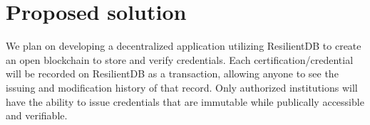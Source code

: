 \section{Proposed solution}

We plan on developing a decentralized application utilizing ResilientDB to create an open blockchain
to store and verify credentials. Each certification/credential will be recorded on ResilientDB as a
transaction, allowing anyone to see the issuing and modification history of that record. Only
authorized institutions will have the ability to issue credentials that are immutable while publically
accessible and verifiable.

